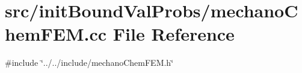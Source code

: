 \section{src/init\+Bound\+Val\+Probs/mechano\+Chem\+F\+EM.cc File Reference}
\label{mechano_chem_f_e_m_8cc}
{\ttfamily \#include \char`\"{}../../include/mechano\+Chem\+F\+E\+M.\+h\char`\"{}}\newline
